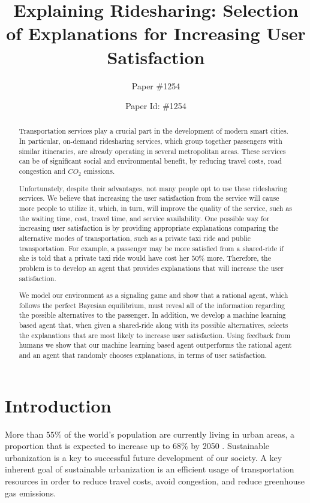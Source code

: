 \documentclass[letterpaper]{article} %
\author{Paper \#1254}
\title{Explaining Ridesharing: Selection of Explanations for Increasing User Satisfaction}
\author{Paper Id: \#1254}
\begin{document}
\maketitle
\begin{abstract}
Transportation services play a crucial part in the development of modern smart cities.  
In particular, on-demand ridesharing services, which group together passengers with similar itineraries, are already operating in several metropolitan areas.
These services can be of significant social and environmental benefit, by reducing travel costs, road congestion and $CO_2$ emissions. 

Unfortunately, despite their advantages, not many people opt to use these ridesharing services. We believe that increasing the user satisfaction from the service will cause more people to utilize it, which, in turn, will improve the quality of the service, such as the waiting time, cost, travel time, and service availability. One possible way for increasing user satisfaction is by providing appropriate explanations comparing the alternative modes of transportation, such as a private taxi ride and public transportation. For example, a passenger may be more satisfied from a shared-ride if she is told that a private taxi ride would have cost her $50\%$ more. Therefore, the problem is to develop an agent that provides explanations that will increase the user satisfaction.

We model our environment as a signaling game and show that a rational agent, which follows the perfect Bayesian equilibrium, must reveal all of the information regarding the possible alternatives to the passenger.
In addition, we develop a machine learning based agent that, when given a shared-ride along with its possible alternatives, selects the explanations that are most likely to increase user satisfaction.
Using feedback from humans we show that our machine learning based agent outperforms the rational agent and an agent that randomly chooses explanations, in terms of user satisfaction.
\end{abstract}


\section{Introduction}
More than $55\%$ of the world’s population are currently living in urban areas, a proportion that is expected to increase up to $68\%$ by 2050 \cite{united2018}. Sustainable urbanization is a key to successful future development of our society. A key inherent goal of sustainable urbanization is an efficient usage of transportation resources in order to reduce travel costs, avoid congestion, and reduce greenhouse gas emissions. 
\end{document}
